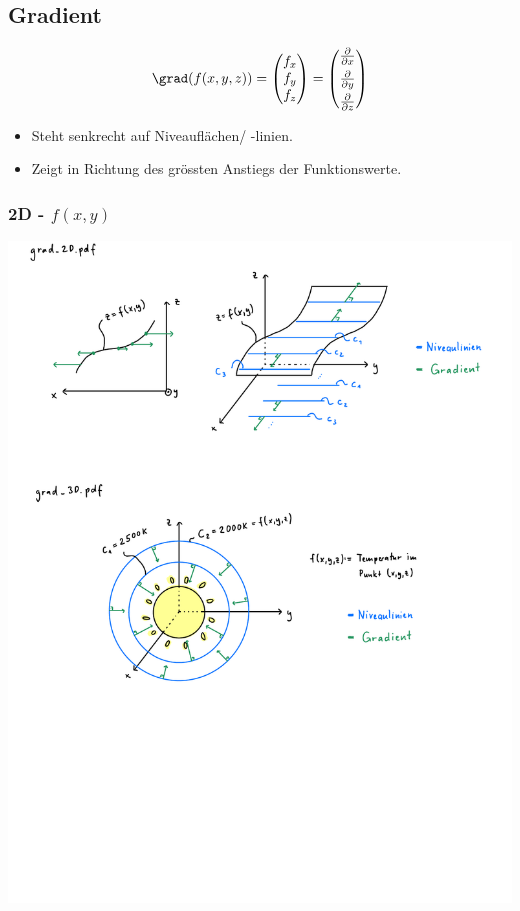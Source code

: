 \subsection{Gradient}
    \vspace{-0.75em}
    $$
        \grad(f(x,y,z)) = 
        \begin{pmatrix}
            f_x \\ f_y \\ f_z
        \end{pmatrix}
        =
        \begin{pmatrix}
            \frac{\partial}{\partial x} \\[0.4em] \frac{\partial}{\partial y} \\[0.4em] \frac{\partial}{\partial z}
        \end{pmatrix}
    $$
    \begin{itemize}
        \item Steht senkrecht auf Niveauflächen/ -linien.
        \item Zeigt in Richtung des grössten Anstiegs der Funktionswerte.
    \end{itemize}
    \vspace*{0.5em}
    \subsubsection{2D - $f(x,y)$}
        \includegraphics[width=\linewidth]{src/Mehrdimensionale-Funktionen_Differentialrechnung/grad_2D.pdf}
